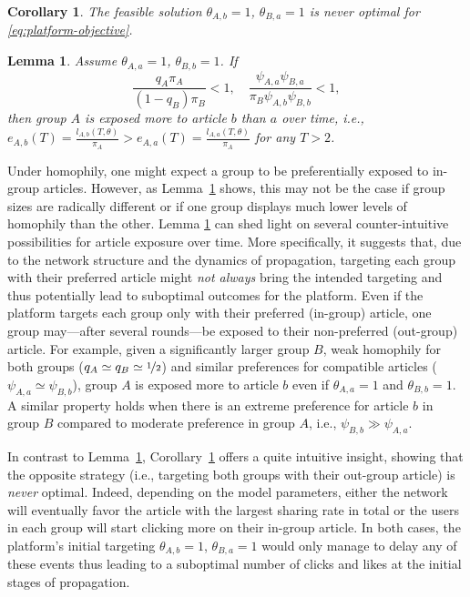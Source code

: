 \documentclass[letterpaper]{article} %
\newtheorem{lemma}{Lemma}
\newtheorem{corollary}{Corollary}
\begin{document}
\begin{corollary}\label{cor:feasible_never_optimal}
The feasible solution $\theta_{A,b}=1$, $\theta_{B,a}=1$ is never optimal for \eqref{eq:platform-objective}.
\end{corollary}

\begin{lemma}\label{lemma:condition_for_higher_intergroup_exposure}
Assume $\theta_{A,a} = 1$, $\theta_{B,b}=1$. If
\footnotesize
\begin{equation}
\label{eq:conditions_A_more_exposed_to_b}
    \frac{q_A \pi_A  }{(1-q_B) \pi_B} <1,\quad  \frac{\psi_{A,a} \psi_{B,a}}{\pi_B \psi_{A,b} \psi_{B,b}}<1,
\end{equation}
\normalsize
then group $A$ is exposed more to article $b$ than $a$ over time, i.e., $e_{A,b}(T) = \frac{l_{A,b}(T,\theta)}{\pi_A} > e_{A,a}(T) = \frac{l_{A,a}(T,\theta)}{\pi_A}$ for any $T>2$.
\end{lemma}

Under homophily, one might expect a group to be preferentially exposed to in-group articles.
However, as Lemma~\ref{lemma:condition_for_higher_intergroup_exposure} shows, this may not be the case if group sizes are radically different or if one group displays much lower levels of homophily than the other.
Lemma \ref{lemma:condition_for_higher_intergroup_exposure} can shed light on several counter-intuitive possibilities for article exposure over time.
More specifically, it suggests that, due to the network structure and the dynamics of propagation, targeting each group with their preferred article might \textit{not always} bring the intended targeting  and thus potentially lead to suboptimal outcomes for the platform.
Even if the platform targets each group only with their preferred (in-group) article, one group may---after several rounds---be exposed to their non-preferred (out-group) article.
For example, given a significantly larger group $B$, weak homophily for both groups ($q_A \simeq q_B \simeq \nicefrac{1}{2}$) and similar preferences for compatible articles ($\psi_{A,a} \simeq \psi_{B,b}$), group $A$ is exposed more to article $b$ even if $\theta_{A,a}=1$ and $\theta_{B,b}=1$.
A similar property holds when there is an extreme preference for article $b$ in group $B$ compared to moderate preference in group $A$, i.e., $\psi_{B,b} \gg \psi_{A,a}$.

In contrast to Lemma~\ref{lemma:condition_for_higher_intergroup_exposure}, Corollary~\ref{cor:feasible_never_optimal} offers a quite intuitive insight, showing that the opposite strategy (i.e., targeting both groups with their out-group article) is \textit{never} optimal.
Indeed, depending on the model parameters, either the network will eventually favor the article with the largest sharing rate in total or the users in each group will start clicking more on their in-group article.
In both cases, the platform's initial targeting $\theta_{A,b}=1$, $\theta_{B,a}=1$ would only manage to delay any of these events thus leading to a suboptimal number of clicks and likes at the initial stages of propagation.
\end{document}
